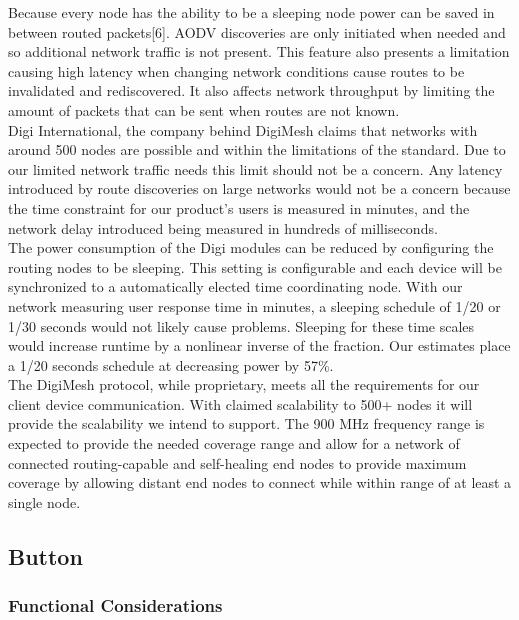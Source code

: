 \documentclass[journal,compsoc]{IEEEtran}
\begin{document}
\noindent Because every node has the ability to be a sleeping node power can be saved in between routed packets[6].  AODV discoveries are only initiated when needed and so additional network traffic is not present.  This feature also presents a limitation causing high latency when changing network conditions cause routes to be invalidated and rediscovered. It also affects network throughput by limiting the amount of packets that can be sent when routes are not known.\\

\noindent Digi International, the company behind DigiMesh claims that networks with around 500 nodes are possible and within the limitations of the standard.  Due to our limited network traffic needs this limit should not be a concern.  Any latency introduced by route discoveries on large networks would not be a concern because the time constraint for our product’s users is measured in minutes, and the network delay introduced being measured in hundreds of milliseconds.\\

\noindent The power consumption of the Digi modules can be reduced by configuring the routing nodes to be sleeping.  This setting is configurable and each device will be synchronized to a automatically elected time coordinating node.  With our network measuring user response time in minutes, a sleeping schedule of 1/20 or 1/30 seconds would not likely cause problems.  Sleeping for these time scales would increase runtime by a nonlinear inverse of the fraction. Our estimates place a 1/20 seconds schedule at decreasing power by 57\%.\\

\noindent The DigiMesh protocol, while proprietary, meets all the requirements for our client device communication.  With claimed scalability to 500+ nodes it will provide the scalability we intend to support.  The 900 MHz frequency range is expected to provide the needed coverage range and allow for a network of connected routing-capable and self-healing end nodes to provide maximum coverage  by allowing distant end nodes to connect while within range of at least a single node.

\subsection{Button}

\subsubsection{Functional Considerations}
\end{document}
